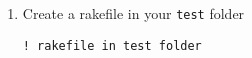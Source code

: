 \begin{enumerate}





\item Create a rakefile in your \verb!test! folder
\begin{verbatim}
! rakefile in test folder

\end{verbatim}
\end{enumerate}

